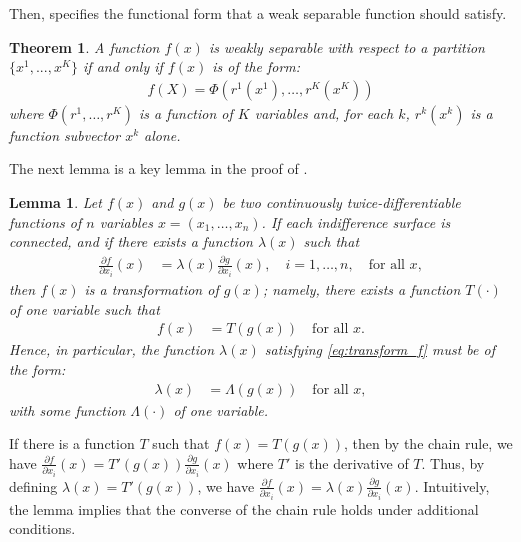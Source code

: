 \documentclass[11pt, a4paper]{article}
\newtheorem{theorem}{Theorem}
\newtheorem{lemma}{Lemma}
\theoremstyle{remark}
\begin{document}
Then, \citet{goldmanNote1964} specifies the functional form that a weak separable function should satisfy.
\begin{theorem}\label{thorem_2_GU}
    A function $f(x)$ is weakly separable with respect to a partition $\{x^1, .. ., x^K\}$ if and only if $f(x)$ is of the form: 
    \begin{align}
        f(X) = \Phi(r^1(x^{1}),\ldots, r^K(x^{K})   )
    \end{align} where $\Phi(r^1,\ldots, r^K)$ is a function of $K$ variables and, for each $k$, $r^k(x^{k})$ is a function subvector $x^{k}$ alone.
\end{theorem}

The next lemma is a key lemma in the proof of \citet{lau1982identifying}.
\begin{lemma}\label{lemma_1_GU}
    Let $f(x)$ and $g(x)$ be two continuously twice-differentiable functions of $n$ variables $x=(x_1, \dots, x_n)$. If each indifference surface is connected, and if there exists a function $\lambda(x)$ such that
    \begin{align}
    \frac{\partial f}{\partial x_i}(x) &= \lambda(x)\frac{\partial g}{\partial x_i}(x), \quad i=1, \dots, n, \quad \text{for all } x, \label{eq:transform_f}
    \end{align}
    then $f(x)$ is a transformation of $g(x)$; namely, there exists a function $T(\cdot)$ of one variable such that
    \begin{align}
    f(x) &= T(g(x)) \quad \text{for all } x.
    \end{align}
    Hence, in particular, the function $\lambda(x)$ satisfying \eqref{eq:transform_f} must be of the form:
    \begin{align}
        \lambda(x) &= \Lambda(g(x)) \quad \text{for all } x, \label{eq:form_of_lambda}
    \end{align}
    with some function $\Lambda(\cdot)$ of one variable.
\end{lemma}
If there is a function $T$ such that $f(x) = T(g(x))$, then by the chain rule, we have $\frac{\partial f}{\partial x_i}(x) = T'(g(x))\frac{\partial g}{\partial x_i}(x)$ where $T'$ is the derivative of $T$.
Thus, by defining $\lambda(x) = T'(g(x))$, we have $\frac{\partial f}{\partial x_i}(x) = \lambda(x)\frac{\partial g}{\partial x_i}(x)$.
Intuitively, the lemma implies that the converse of the chain rule holds under additional conditions.
\end{document}
